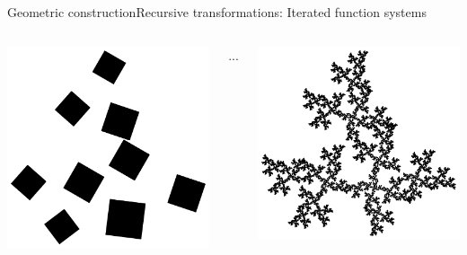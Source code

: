 \documentclass[xcolor=x11names,compress,professionalfonts]{beamer}
\renewcommand{\(}{\begin{columns}}
\renewcommand{\)}{\end{columns}}
\newcommand{\<}[1]{\begin{column}{#1}}
\renewcommand{\>}{\end{column}}
\begin{document}
\begin{frame}{Geometric construction}{Recursive transformations: Iterated function systems}
\begin{columns}
  \begin{column}{3cm}
    \includegraphics[scale=\s]{leaf2.pdf}
  \end{column}
  ...
    \begin{column}{3cm}
    \includegraphics[scale=\s]{leafInfty.pdf}
  \end{column}
\end{columns}

\end{frame}
\end{document}
